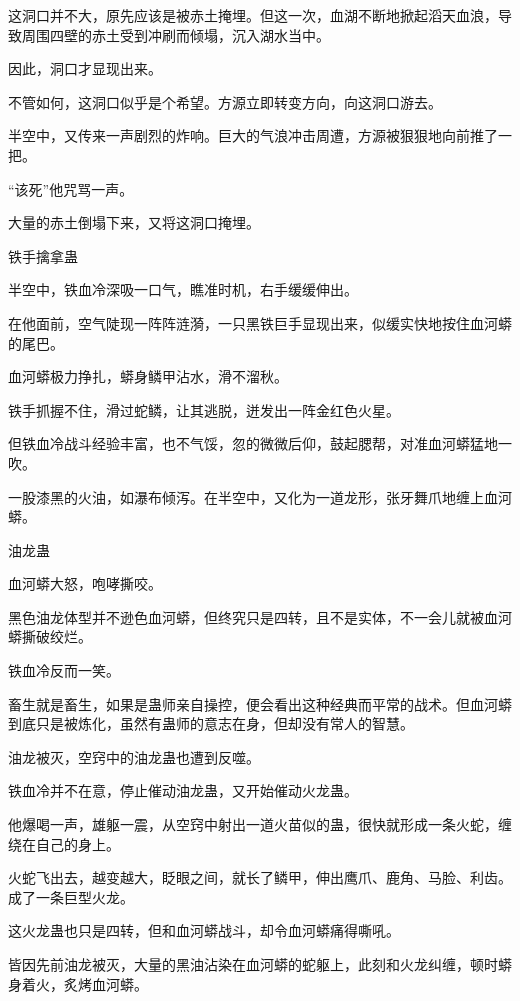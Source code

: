 
\begin{this_body}

这洞口并不大，原先应该是被赤土掩埋。但这一次，血湖不断地掀起滔天血浪，导致周围四壁的赤土受到冲刷而倾塌，沉入湖水当中。

因此，洞口才显现出来。

不管如何，这洞口似乎是个希望。方源立即转变方向，向这洞口游去。

半空中，又传来一声剧烈的炸响。巨大的气浪冲击周遭，方源被狠狠地向前推了一把。

“该死”他咒骂一声。

大量的赤土倒塌下来，又将这洞口掩埋。

铁手擒拿蛊

半空中，铁血冷深吸一口气，瞧准时机，右手缓缓伸出。

在他面前，空气陡现一阵阵涟漪，一只黑铁巨手显现出来，似缓实快地按住血河蟒的尾巴。

血河蟒极力挣扎，蟒身鳞甲沾水，滑不溜秋。

铁手抓握不住，滑过蛇鳞，让其逃脱，迸发出一阵金红色火星。

但铁血冷战斗经验丰富，也不气馁，忽的微微后仰，鼓起腮帮，对准血河蟒猛地一吹。

一股漆黑的火油，如瀑布倾泻。在半空中，又化为一道龙形，张牙舞爪地缠上血河蟒。

油龙蛊

血河蟒大怒，咆哮撕咬。

黑色油龙体型并不逊色血河蟒，但终究只是四转，且不是实体，不一会儿就被血河蟒撕破绞烂。

铁血冷反而一笑。

畜生就是畜生，如果是蛊师亲自操控，便会看出这种经典而平常的战术。但血河蟒到底只是被炼化，虽然有蛊师的意志在身，但却没有常人的智慧。

油龙被灭，空窍中的油龙蛊也遭到反噬。

铁血冷并不在意，停止催动油龙蛊，又开始催动火龙蛊。

他爆喝一声，雄躯一震，从空窍中射出一道火苗似的蛊，很快就形成一条火蛇，缠绕在自己的身上。

火蛇飞出去，越变越大，眨眼之间，就长了鳞甲，伸出鹰爪、鹿角、马脸、利齿。成了一条巨型火龙。

这火龙蛊也只是四转，但和血河蟒战斗，却令血河蟒痛得嘶吼。

皆因先前油龙被灭，大量的黑油沾染在血河蟒的蛇躯上，此刻和火龙纠缠，顿时蟒身着火，炙烤血河蟒。


\end{this_body}
